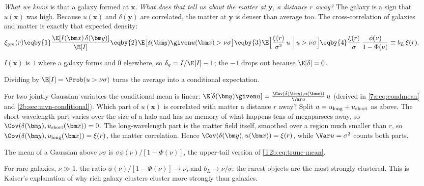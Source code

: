 \emph{What we know} is that a galaxy formed at $\bm x$. \emph{What does that tell us about the matter at $\bm y$, a distance $r$ away?} The galaxy is a sign that $u(\bm x)$ was high. Because $u(\bm x)$ and $\delta(\bm y)$ are correlated, the matter at $\bm y$ is denser than average too. The cross-correlation of galaxies and matter is exactly that expected density:
\begin{align}
  \xi_{gm}(r)
  &\eqby{1}\frac{\E[I(\bm x)\,\delta(\bm y)]}{\E[I]}
  \eqby{2}\E\big[\delta(\bm y)\given u(\bm x)>\nu\sigma\big]
  \eqby{3}\E\Big[\frac{\xi(r)}{\sigma^2}\,u\;\Big|\;u>\nu\sigma\Big]
  \eqby{4}\frac{\xi(r)}{\sigma}\,\frac{\phi(\nu)}{1-\Phi(\nu)}\equiv b_L\,\xi(r) .
  \label{T2b:eq:threshold-bias}
\end{align}
\begin{explain}
  \item $I(\bm x)$ is $1$ where a galaxy forms and $0$ elsewhere, so $\delta_g=I/\E[I]-1$; the $-1$ drops out because $\E[\delta]=0$.
  \item Dividing by $\E[I]=\Prob(u>\nu\sigma)$ turns the average into a conditional expectation.
  \item For two jointly Gaussian variables the conditional mean is linear: $\E[\delta(\bm y)\given u]=\frac{\Cov(\delta(\bm y),u(\bm x))}{\Var u}\,u$ (derived in \cref{7a:eq:condmean} and \cref{2b:sec:mvn-conditional}). Which part of $u(\bm x)$ is correlated with matter a distance $r$ away? Split $u=u_{\rm long}+u_{\rm short}$ as above. The short-wavelength part varies over the size of a halo and has no memory of what happens tens of megaparsecs away, so $\Cov(\delta(\bm y),u_{\rm short}(\bm x))=0$. The long-wavelength part is the matter field itself, smoothed over a region much smaller than $r$, so $\Cov(\delta(\bm y),u_{\rm long}(\bm x))=\xi(r)$, the matter correlation. Hence $\Cov(\delta(\bm y),u(\bm x))=\xi(r)$, while $\Var u=\sigma^2$ counts both parts.
  \item The mean of a Gaussian above $\nu\sigma$ is $\sigma\phi(\nu)/[1-\Phi(\nu)]$, the upper-tail version of \eqref{T2b:eq:trunc-mean}.
\end{explain}
For rare galaxies, $\nu\gg1$, the ratio $\phi(\nu)/[1-\Phi(\nu)]\to\nu$, and $b_L\to\nu/\sigma$: the rarest objects are the most strongly clustered. This is Kaiser's explanation of why rich galaxy clusters cluster more strongly than galaxies.

